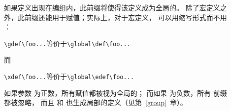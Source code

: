 \documentclass{book}
\begin{document}
\begin{description}
\item []
如果定义出现在编组内，此前缀将使得该定义成为全局的。
除了宏定义之外，此前缀还能用于赋值；实际上，对于宏定义，
可以用缩写形式而不用 ：
\begin{disp}\verb>\gdef\foo...>\quad 等价于\quad \verb>\global\def\foo...>
\end{disp} 而
\begin{disp}\verb>\xdef\foo...>\quad 等价于\quad \verb>\global\edef\foo...>
\end{disp}

如果参数  为正数，所有赋值都被视为全局的；
而如果  为负数，所有  前缀都被忽略，
而且  和  也生成局部的定义（见第~\ref{group}~章）。


\end{description}
\end{document}
